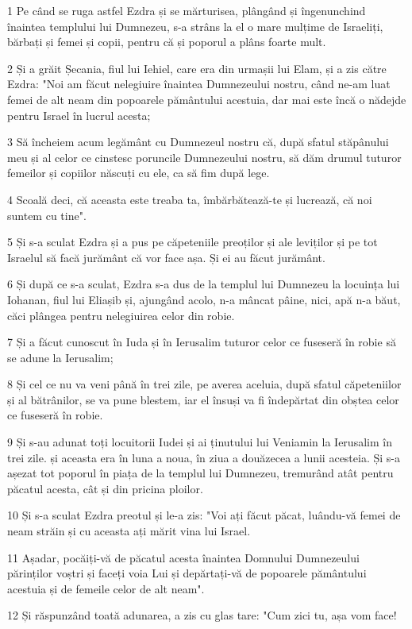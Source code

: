 \par 1 Pe când se ruga astfel Ezdra și se mărturisea, plângând și îngenunchind înaintea templului lui Dumnezeu, s-a strâns la el o mare mulțime de Israeliți, bărbați și femei și copii, pentru că și poporul a plâns foarte mult.
\par 2 Și a grăit Șecania, fiul lui Iehiel, care era din urmașii lui Elam, și a zis către Ezdra: "Noi am făcut nelegiuire înaintea Dumnezeului nostru, când ne-am luat femei de alt neam din popoarele pământului acestuia, dar mai este încă o nădejde pentru Israel în lucrul acesta;
\par 3 Să încheiem acum legământ cu Dumnezeul nostru că, după sfatul stăpânului meu și al celor ce cinstesc poruncile Dumnezeului nostru, să dăm drumul tuturor femeilor și copiilor născuți cu ele, ca să fim după lege.
\par 4 Scoală deci, că aceasta este treaba ta, îmbărbătează-te și lucrează, că noi suntem cu tine".
\par 5 Și s-a sculat Ezdra și a pus pe căpeteniile preoților și ale leviților și pe tot Israelul să facă jurământ că vor face așa. Și ei au făcut jurământ.
\par 6 Și după ce s-a sculat, Ezdra s-a dus de la templul lui Dumnezeu la locuința lui Iohanan, fiul lui Eliașib și, ajungând acolo, n-a mâncat pâine, nici, apă n-a băut, căci plângea pentru nelegiuirea celor din robie.
\par 7 Și a făcut cunoscut în Iuda și în Ierusalim tuturor celor ce fuseseră în robie să se adune la Ierusalim;
\par 8 Și cel ce nu va veni până în trei zile, pe averea aceluia, după sfatul căpeteniilor și al bătrânilor, se va pune blestem, iar el însuși va fi îndepărtat din obștea celor ce fuseseră în robie.
\par 9 Și s-au adunat toți locuitorii Iudei și ai ținutului lui Veniamin la Ierusalim în trei zile. și aceasta era în luna a noua, în ziua a douăzecea a lunii acesteia. Și s-a așezat tot poporul în piața de la templul lui Dumnezeu, tremurând atât pentru păcatul acesta, cât și din pricina ploilor.
\par 10 Și s-a sculat Ezdra preotul și le-a zis: "Voi ați făcut păcat, luându-vă femei de neam străin și cu aceasta ați mărit vina lui Israel.
\par 11 Așadar, pocăiți-vă de păcatul acesta înaintea Domnului Dumnezeului părinților voștri și faceți voia Lui și depărtați-vă de popoarele pământului acestuia și de femeile celor de alt neam".
\par 12 Și răspunzând toată adunarea, a zis cu glas tare: "Cum zici tu, așa vom face!
